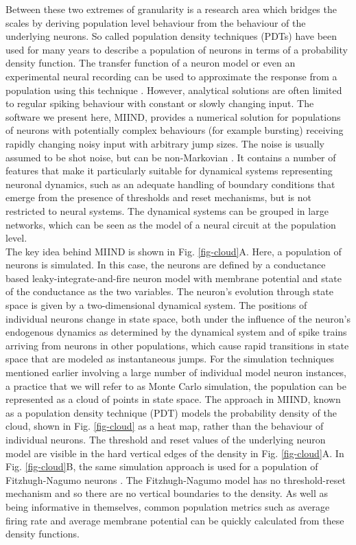 \documentclass[utf8]{frontiersSCNS} %
\begin{document}
Between these two extremes of granularity is a research area which bridges the scales by deriving population level behaviour from the behaviour of the underlying neurons. So called population density techniques (PDTs) have been used for many years \citep{knight1972dynamics,knight1996dynamical,omurtag2000} to describe a population of neurons in terms of a probability density function. The transfer function of a neuron model or even an experimental neural recording can be used to approximate the response from a population using this technique \citep{wilson1972excitatory,el2009master,carlu2020mean}. However, analytical solutions are often limited to regular spiking behaviour with constant or slowly changing input. The software we present here, MIIND, provides a numerical solution for populations of neurons with potentially complex behaviours (for example bursting) receiving rapidly changing noisy input with arbitrary jump sizes. The noise is usually assumed to be shot noise, but can be non-Markovian \citep{lai2017population}. 
It contains a number of features that make it particularly suitable for dynamical systems representing neuronal dynamics, such as an adequate handling of boundary conditions that emerge from the presence of thresholds and reset mechanisms, but is not restricted to neural systems. The dynamical systems can be grouped in large networks, which can be seen as the model of a neural circuit at the population level.\\

The key idea behind MIIND is shown in Fig. \ref{fig-cloud}A. Here, a population of neurons is simulated. In this case, the neurons are defined by a conductance based leaky-integrate-and-fire neuron model with membrane potential and state of the conductance as the two variables. The neuron's evolution through state space is given by a two-dimensional dynamical system. The positions of individual neurons change in state space, both under the influence of the neuron's endogenous dynamics as determined by the dynamical system and of spike trains arriving from neurons in other populations, which cause rapid transitions in state space that are modeled as instantaneous jumps. For the simulation techniques mentioned earlier involving a large number of individual model neuron instances, a practice that we will refer to as Monte Carlo simulation, the population can be represented as a cloud of points in state space. The approach in MIIND, known as a population density technique (PDT) models the probability density of the cloud, shown in Fig. \ref{fig-cloud} as a heat map, rather than the behaviour of individual neurons. The threshold and reset values of the underlying neuron model are visible in the hard vertical edges of the density in Fig. \ref{fig-cloud}A. In Fig. \ref{fig-cloud}B, the same simulation approach is used for a population of Fitzhugh-Nagumo neurons \citep{fitzhugh1961impulses,nagumo1962active}. The Fitzhugh-Nagumo model has no threshold-reset mechanism and so there are no vertical boundaries to the density. As well as being informative in themselves, common population metrics such as average firing rate and average membrane potential can be quickly calculated from these density functions. \\
\end{document}
